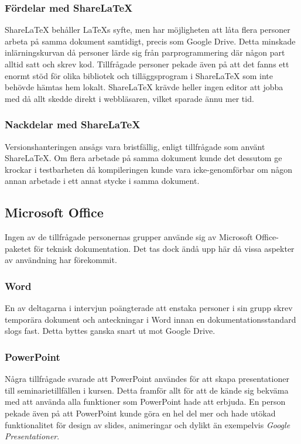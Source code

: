 \subsubsection{Fördelar med ShareLaTeX}
ShareLaTeX behåller LaTeXs syfte, men har möjligheten att låta flera personer arbeta på samma dokument samtidigt, precis som Google Drive. Detta minskade inlärningskurvan då personer lärde sig från parprogrammering där någon part alltid satt och skrev kod. Tillfrågade personer pekade även på att det fanns ett enormt stöd för olika bibliotek och tilläggsprogram i ShareLaTeX som inte behövde hämtas hem lokalt. ShareLaTeX krävde heller ingen editor att jobba med då allt skedde direkt i webbläsaren, vilket sparade ännu mer tid.
 
\subsubsection{Nackdelar med ShareLaTeX}
Versionshanteringen ansågs vara bristfällig, enligt tillfrågade som använt ShareLaTeX. Om flera arbetade på samma dokument kunde det dessutom ge krockar i testbarheten då kompileringen kunde vara icke-genomförbar om någon annan arbetade i ett annat stycke i samma dokument.

\subsection{Microsoft Office}
\label{sec:wassing-microsoft-office}
Ingen av de tillfrågade personernas grupper använde sig av Microsoft Office-paketet för teknisk dokumentation. Det tas dock ändå upp här då vissa aspekter av användning har förekommit.

\subsubsection{Word}
En av deltagarna i intervjun poängterade att enstaka personer i sin grupp skrev temporära dokument och anteckningar i Word innan en dokumentationsstandard slogs fast. Detta byttes ganska snart ut mot Google Drive.

\subsubsection{PowerPoint}
Några tillfrågade svarade att PowerPoint användes för att skapa presentationer till seminarietillfällen i kursen. Detta framför allt för att de kände sig bekväma med att använda alla funktioner som PowerPoint hade att erbjuda. En person pekade även på att PowerPoint kunde göra en hel del mer och hade utökad funktionalitet för design av slides, animeringar och dylikt än exempelvis \textit{Google Presentationer}.

